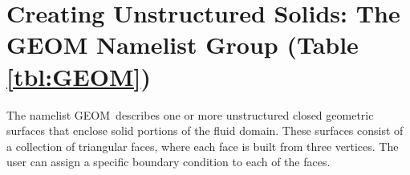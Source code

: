 \documentclass[12pt]{article}
\begin{document}


\vspace{1.0in}

%
%
%
%
%
%
%
%
%
%
%

\section{Creating Unstructured Solids: The \texorpdfstring{{\ct GEOM}}{GEOM} Namelist Group (Table \ref{tbl:GEOM})}
\label{info:GEOM}

The namelist {\ct GEOM}\ describes one or more unstructured closed geometric surfaces that enclose solid portions
of the fluid domain. These surfaces consist of a collection of triangular faces, where each face is built
from three vertices. The user can assign a specific boundary condition to each of the faces.
\end{document}
